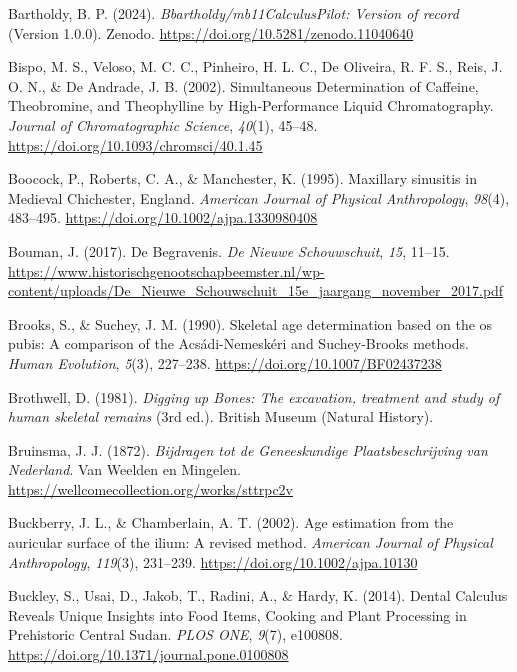 \documentclass[
]{article}
\newlength{\cslhangindent}
\newenvironment{CSLReferences}[2] %
 {\begin{list}{}{%
  \setlength{\itemindent}{0pt}
  \setlength{\leftmargin}{0pt}
  \setlength{\parsep}{0pt}
  \ifodd #1
   \setlength{\leftmargin}{\cslhangindent}
   \setlength{\itemindent}{-1\cslhangindent}
  \fi
  \setlength{\itemsep}{#2\baselineskip}}}
 {\end{list}}
\begin{document}
\begin{CSLReferences}{1}{0}
Bartholdy, B. P. (2024). \emph{Bbartholdy/{mb11CalculusPilot}: {Version}
of record} (Version 1.0.0). {Zenodo}.
\url{https://doi.org/10.5281/zenodo.11040640}

Bispo, M. S., Veloso, M. C. C., Pinheiro, H. L. C., De Oliveira, R. F.
S., Reis, J. O. N., \& De Andrade, J. B. (2002). Simultaneous
{Determination} of {Caffeine}, {Theobromine}, and {Theophylline} by
{High-Performance Liquid Chromatography}. \emph{Journal of
Chromatographic Science}, \emph{40}(1), 45--48.
\url{https://doi.org/10.1093/chromsci/40.1.45}

Boocock, P., Roberts, C. A., \& Manchester, K. (1995). Maxillary
sinusitis in {Medieval Chichester}, {England}. \emph{American Journal of
Physical Anthropology}, \emph{98}(4), 483--495.
\url{https://doi.org/10.1002/ajpa.1330980408}

Bouman, J. (2017). De Begravenis. \emph{De Nieuwe Schouwschuit},
\emph{15}, 11--15.
\url{https://www.historischgenootschapbeemster.nl/wp-content/uploads/De_Nieuwe_Schouwschuit_15e_jaargang_november_2017.pdf}

Brooks, S., \& Suchey, J. M. (1990). Skeletal age determination based on
the os pubis: {A} comparison of the {Acsádi-Nemeskéri} and
{Suchey-Brooks} methods. \emph{Human Evolution}, \emph{5}(3), 227--238.
\url{https://doi.org/10.1007/BF02437238}

Brothwell, D. (1981). \emph{Digging up {Bones}: {The} excavation,
treatment and study of human skeletal remains} (3rd ed.). {British
Museum (Natural History)}.

Bruinsma, J. J. (1872). \emph{Bijdragen tot de {Geneeskundige
Plaatsbeschrijving} van {Nederland}}. {Van Weelden en Mingelen}.
\url{https://wellcomecollection.org/works/sttrpc2v}

Buckberry, J. L., \& Chamberlain, A. T. (2002). Age estimation from the
auricular surface of the ilium: A revised method. \emph{American Journal
of Physical Anthropology}, \emph{119}(3), 231--239.
\url{https://doi.org/10.1002/ajpa.10130}

Buckley, S., Usai, D., Jakob, T., Radini, A., \& Hardy, K. (2014).
Dental {Calculus Reveals Unique Insights} into {Food Items}, {Cooking}
and {Plant Processing} in {Prehistoric Central Sudan}. \emph{PLOS ONE},
\emph{9}(7), e100808. \url{https://doi.org/10.1371/journal.pone.0100808}


\end{CSLReferences}
\end{document}
